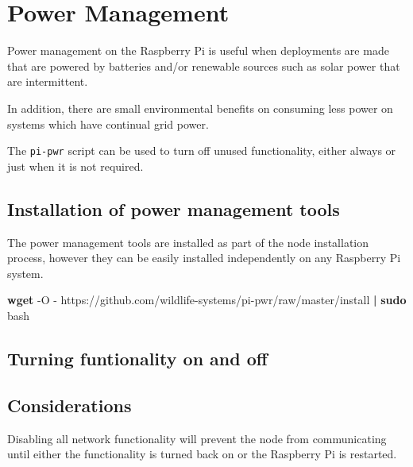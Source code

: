 \documentclass[
]{book}
\newenvironment{Shaded}{\begin{snugshade}}{\end{snugshade}}
\newcommand{\AttributeTok}[1]{\textcolor[rgb]{0.13,0.29,0.53}{#1}}
\newcommand{\FunctionTok}[1]{\textcolor[rgb]{0.13,0.29,0.53}{\textbf{#1}}}
\newcommand{\KeywordTok}[1]{\textcolor[rgb]{0.13,0.29,0.53}{\textbf{#1}}}
\newcommand{\NormalTok}[1]{#1}
\begin{document}
\hypertarget{power-management}{%
\chapter{Power Management}\label{power-management}}

Power management on the Raspberry Pi is useful when deployments are made that are powered by batteries and/or renewable sources such as solar power that are intermittent.

In addition, there are small environmental benefits on consuming less power on systems which have continual grid power.

The \texttt{pi-pwr} script can be used to turn off unused functionality, either always or just when it is not required.

\hypertarget{installation-of-power-management-tools}{%
\section{Installation of power management tools}\label{installation-of-power-management-tools}}

The power management tools are installed as part of the node installation process, however they can be easily installed independently on any Raspberry Pi system.

\begin{Shaded}
\begin{Highlighting}[]
\FunctionTok{wget} \AttributeTok{{-}O} \AttributeTok{{-}}\NormalTok{ https://github.com/wildlife{-}systems/pi{-}pwr/raw/master/install }\KeywordTok{|} \FunctionTok{sudo}\NormalTok{ bash}
\end{Highlighting}
\end{Shaded}

\hypertarget{turning-funtionality-on-and-off}{%
\section{Turning funtionality on and off}\label{turning-funtionality-on-and-off}}

\hypertarget{considerations}{%
\section{Considerations}\label{considerations}}

Disabling all network functionality will prevent the node from communicating until either the functionality is turned back on or the Raspberry Pi is restarted.
\end{document}
